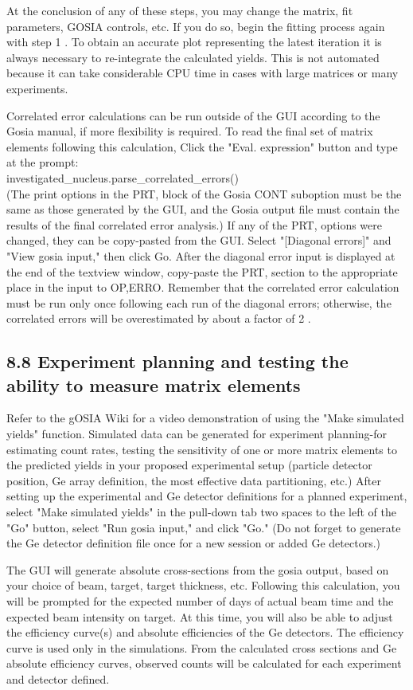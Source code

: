 \documentclass[10pt]{article}
\begin{document}
At the conclusion of any of these steps, you may change the matrix, fit parameters, GOSIA controls, etc. If you do so, begin the fitting process again with step 1 . To obtain an accurate plot representing the latest iteration it is always necessary to re-integrate the calculated yields. This is not automated because it can take considerable CPU time in cases with large matrices or many experiments.

Correlated error calculations can be run outside of the GUI according to the Gosia manual, if more flexibility is required. To read the final set of matrix elements following this calculation, Click the "Eval. expression" button and type at the prompt:\\
investigated\_nucleus.parse\_correlated\_errors()\\[0pt]
(The print options in the PRT, block of the Gosia CONT suboption must be the same as those generated by the GUI, and the Gosia output file must contain the results of the final correlated error analysis.) If any of the PRT, options were changed, they can be copy-pasted from the GUI. Select "[Diagonal errors]" and "View gosia input," then click Go. After the diagonal error input is displayed at the end of the textview window, copy-paste the PRT, section to the appropriate place in the input to OP,ERRO. Remember that the correlated error calculation must be run only once following each run of the diagonal errors; otherwise, the correlated errors will be overestimated by about a factor of 2 .

\subsection*{8.8 Experiment planning and testing the ability to measure matrix elements}
Refer to the gOSIA Wiki for a video demonstration of using the "Make simulated yields" function. Simulated data can be generated for experiment planning-for estimating count rates, testing the sensitivity of one or more matrix elements to the predicted yields in your proposed experimental setup (particle detector position, Ge array definition, the most effective data partitioning, etc.) After setting up the experimental and Ge detector definitions for a planned experiment, select "Make simulated yields" in the pull-down tab two spaces to the left of the "Go" button, select "Run gosia input," and click "Go." (Do not forget to generate the Ge detector definition file once for a new session or added Ge detectors.)

The GUI will generate absolute cross-sections from the gosia output, based on your choice of beam, target, target thickness, etc. Following this calculation, you will be prompted for the expected number of days of actual beam time and the expected beam intensity on target. At this time, you will also be able to adjust the efficiency curve(s) and absolute efficiencies of the Ge detectors. The efficiency curve is used only in the simulations. From the calculated cross sections and Ge absolute efficiency curves, observed counts will be calculated for each experiment and detector defined.
\end{document}
